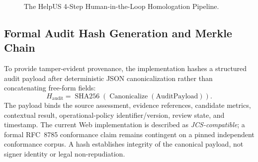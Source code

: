 \begin{figure}[htbp]
    \centering
    \begin{minipage}{0.95\linewidth}
        \centering
    \end{minipage}
    \caption{The HelpUS 4-Step Human-in-the-Loop Homologation Pipeline.}
    \label{fig:hitl_pipeline}
\end{figure}

\subsection{Formal Audit Hash Generation and Merkle Chain}
To provide tamper-evident provenance, the implementation hashes a structured audit payload after deterministic JSON canonicalization rather than concatenating free-form fields:
\begin{equation}
    H_{\text{audit}} = \operatorname{SHA256}\!\left(\operatorname{Canonicalize}(\text{AuditPayload})\right).
\end{equation}
The payload binds the source assessment, evidence references, candidate metrics, contextual result, operational-policy identifier/version, review state, and timestamp. The current Web implementation is described as \emph{JCS-compatible}; a formal RFC~8785 conformance claim remains contingent on a pinned independent conformance corpus. A hash establishes integrity of the canonical payload, not signer identity or legal non-repudiation.

